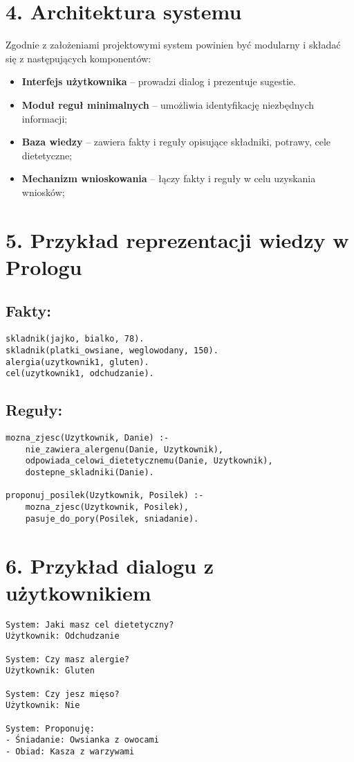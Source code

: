\documentclass{article}
\begin{document}
\section*{4. Architektura systemu}
Zgodnie z założeniami projektowymi system powinien być modularny i składać się z następujących komponentów:

\begin{itemize}
  \item \textbf{Interfejs użytkownika} – prowadzi dialog i prezentuje sugestie.
  \item \textbf{Moduł reguł minimalnych} – umożliwia identyfikację niezbędnych informacji;
  \item \textbf{Baza wiedzy} – zawiera fakty i reguły opisujące składniki, potrawy, cele dietetyczne;
  \item \textbf{Mechanizm wnioskowania} – łączy fakty i reguły w celu uzyskania wniosków;
\end{itemize}

\section*{5. Przykład reprezentacji wiedzy w Prologu}
\subsection*{Fakty:}
\begin{verbatim}
skladnik(jajko, bialko, 78).
skladnik(platki_owsiane, weglowodany, 150).
alergia(uzytkownik1, gluten).
cel(uzytkownik1, odchudzanie).
\end{verbatim}

\subsection*{Reguły:}
\begin{verbatim}
mozna_zjesc(Uzytkownik, Danie) :-
    nie_zawiera_alergenu(Danie, Uzytkownik),
    odpowiada_celowi_dietetycznemu(Danie, Uzytkownik),
    dostepne_skladniki(Danie).

proponuj_posilek(Uzytkownik, Posilek) :-
    mozna_zjesc(Uzytkownik, Posilek),
    pasuje_do_pory(Posilek, sniadanie).
\end{verbatim}

\section*{6. Przykład dialogu z użytkownikiem}
\begin{verbatim}
System: Jaki masz cel dietetyczny?
Użytkownik: Odchudzanie

System: Czy masz alergie?
Użytkownik: Gluten

System: Czy jesz mięso?
Użytkownik: Nie

System: Proponuję:
- Śniadanie: Owsianka z owocami
- Obiad: Kasza z warzywami
\end{verbatim}
\end{document}
